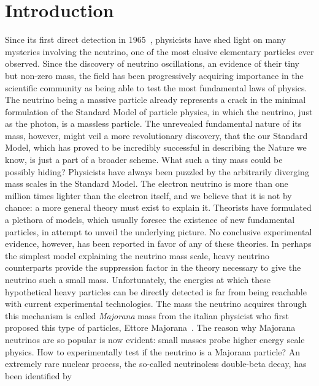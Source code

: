 
\chapter{Introduction}%
\label{chap:introduction}

Since its first direct detection in 1965~\cite{Cowan1956}, physicists have shed light on
many mysteries involving the neutrino, one of the most elusive elementary particles ever
observed. Since the discovery of neutrino oscillations, an evidence of their tiny but
non-zero mass, the field has been progressively acquiring importance in the scientific
community as being able to test the most fundamental laws of physics. The neutrino being a
massive particle already represents a crack in the minimal formulation of the Standard
Model of particle physics, in which the neutrino, just as the photon, is a massless
particle. The unrevealed fundamental nature of its mass, however, might veil a more
revolutionary discovery, that the our Standard Model, which has proved to be incredibly
successful in describing the Nature we know, is just a part of a broader scheme.
\newpar
What such a tiny mass could be possibly hiding? Physicists have always been puzzled by the
arbitrarily diverging mass scales in the Standard Model. The electron neutrino is more
than one million times lighter than the electron itself, and we believe that it is not by
chance: a more general theory must exist to explain it. Theorists have formulated a
plethora of models, which usually foresee the existence of new fundamental particles, in
attempt to unveil the underlying picture. No conclusive experimental evidence, however,
has been reported in favor of any of these theories. In perhaps the simplest model
explaining the neutrino mass scale, heavy neutrino counterparts provide the suppression
factor in the theory necessary to give the neutrino such a small mass. Unfortunately, the
energies at which these hypothetical heavy particles can be directly detected is far from
being reachable with current experimental technologies. The mass the neutrino acquires
through this mechanism is called \emph{Majorana} mass from the italian physicist who first
proposed this type of particles, Ettore Majorana~\cite{Majorana1932}. The reason why
Majorana neutrinos are so popular is now evident: small masses probe higher energy scale
physics.
\newpar
How to experimentally test if the neutrino is a Majorana particle? An extremely rare
nuclear process, the so-called neutrinoless double-beta decay, has been identified by
